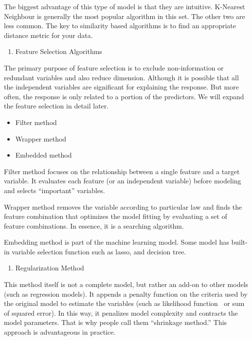 \documentclass[
]{article}
\providecommand{\tightlist}{%
  \setlength{\itemsep}{0pt}\setlength{\parskip}{0pt}}
\begin{document}
The biggest advantage of this type of model is that they are intuitive.
K-Nearest Neighbour is generally the most popular algorithm in this set.
The other two are less common. The key to similarity based algorithms is
to find an appropriate distance metric for your data.

\begin{enumerate}
\def\labelenumi{\arabic{enumi}.}
\setcounter{enumi}{2}
\tightlist
\item
  Feature Selection Algorithms
\end{enumerate}

The primary purpose of feature selection is to exclude non-information
or redundant variables and also reduce dimension. Although it is
possible that all the independent variables are significant for
explaining the response. But more often, the response is only related to
a portion of the predictors. We will expand the feature selection in
detail later.

\begin{itemize}
\tightlist
\item
  Filter method
\item
  Wrapper method
\item
  Embedded method
\end{itemize}

Filter method focuses on the relationship between a single feature and a
target variable. It evaluates each feature (or an independent variable)
before modeling and selects ``important'' variables.

Wrapper method removes the variable according to particular law and
finds the feature combination that optimizes the model fitting by
evaluating a set of feature combinations. In essence, it is a searching
algorithm.

Embedding method is part of the machine learning model. Some model has
built-in variable selection function such as lasso, and decision tree.

\begin{enumerate}
\def\labelenumi{\arabic{enumi}.}
\setcounter{enumi}{3}
\tightlist
\item
  Regularization Method
\end{enumerate}

This method itself is not a complete model, but rather an add-on to
other models (such as regression models). It appends a penalty function
on the criteria used by the original model to estimate the variables
(such as likelihood function or sum of squared error). In this way, it
penalizes model complexity and contracts the model parameters. That is
why people call them ``shrinkage method.'' This approach is advantageous
in practice.
\end{document}
